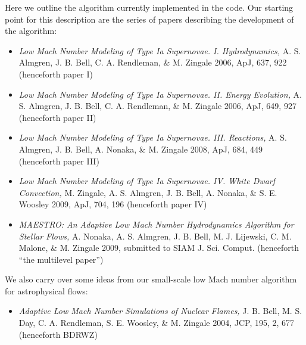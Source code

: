 Here we outline the algorithm currently implemented in the code.  Our
starting point for this description are the series of papers describing
the development of the algorithm:
\begin{itemize}
\item {\em Low Mach Number Modeling of Type Ia
  Supernovae. I. Hydrodynamics,} A. S. Almgren, J. B. Bell, 
  C. A. Rendleman, \& M. Zingale 2006, ApJ, 637, 922 (henceforth
  paper I)
\item {\em Low Mach Number Modeling of Type Ia Supernovae. II. Energy
  Evolution,} A. S. Almgren, J. B. Bell, C. A. Rendleman, \& M. Zingale
  2006, ApJ, 649, 927 (henceforth paper II)
\item {\em Low Mach Number Modeling of Type Ia Supernovae. III. Reactions,}
  A. S. Almgren, J. B. Bell, A. Nonaka, \& M. Zingale
  2008, ApJ, 684, 449 (henceforth paper III)
\item {\em Low Mach Number Modeling of Type Ia Supernovae. IV. White Dwarf Convection,}
  M. Zingale, A. S. Almgren, J. B. Bell, A. Nonaka, \& S. E. Woosley
  2009, ApJ, 704, 196 (henceforth paper IV)
\item {\em MAESTRO: An Adaptive Low Mach Number Hydrodynamics Algorithm for Stellar
  Flows,} A. Nonaka, A. S. Almgren, J. B. Bell, M. J. Lijewski, C. M. Malone,
  \& M. Zingale 2009, submitted to SIAM J. Sci. Comput. 
  (henceforth ``the multilevel paper'')
\end{itemize}
We also carry over some ideas from our small-scale low Mach number algorithm
for astrophysical flows:
\begin{itemize}
\item {\em Adaptive Low Mach Number Simulations of Nuclear Flames,}
J. B. Bell, M. S. Day, C. A. Rendleman, S. E. Woosley, \& M. Zingale
2004, JCP, 195, 2, 677 (henceforth BDRWZ)
\end{itemize}

